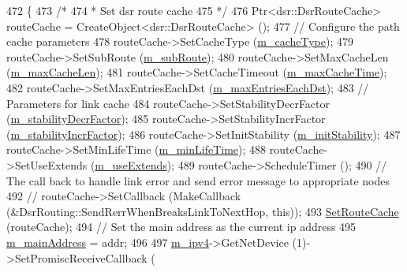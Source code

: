 \begin{DoxyCode}
472             \{
473               \textcolor{comment}{/*}
474 \textcolor{comment}{               * Set dsr route cache}
475 \textcolor{comment}{               */}
476               Ptr<dsr::DsrRouteCache> routeCache = CreateObject<dsr::DsrRouteCache> ();
477               \textcolor{comment}{// Configure the path cache parameters}
478               routeCache->SetCacheType (\hyperlink{classns3_1_1dsr_1_1DsrRouting_a07e25fa5f4aebf7b129a31853988045b}{m\_cacheType});
479               routeCache->SetSubRoute (\hyperlink{classns3_1_1dsr_1_1DsrRouting_a83f7a7d54f8b078d987d46cf6edcd08e}{m\_subRoute});
480               routeCache->SetMaxCacheLen (\hyperlink{classns3_1_1dsr_1_1DsrRouting_afce2c0909aecc7dfe4528f7f6b042019}{m\_maxCacheLen});
481               routeCache->SetCacheTimeout (\hyperlink{classns3_1_1dsr_1_1DsrRouting_a76d8abfedbda7429e983c407748400be}{m\_maxCacheTime});
482               routeCache->SetMaxEntriesEachDst (\hyperlink{classns3_1_1dsr_1_1DsrRouting_a470ec4bd470cd1d802621752331d9916}{m\_maxEntriesEachDst});
483               \textcolor{comment}{// Parameters for link cache}
484               routeCache->SetStabilityDecrFactor (\hyperlink{classns3_1_1dsr_1_1DsrRouting_a4a6db69db44738ae07289fa0993ac916}{m\_stabilityDecrFactor});
485               routeCache->SetStabilityIncrFactor (\hyperlink{classns3_1_1dsr_1_1DsrRouting_a9c6b73944ece2adc5f06b5010d9e55f2}{m\_stabilityIncrFactor});
486               routeCache->SetInitStability (\hyperlink{classns3_1_1dsr_1_1DsrRouting_a9b68bafde23cf10e425d341f91da3b5e}{m\_initStability});
487               routeCache->SetMinLifeTime (\hyperlink{classns3_1_1dsr_1_1DsrRouting_ad7daf5388ab1104e535b27bb4eae1421}{m\_minLifeTime});
488               routeCache->SetUseExtends (\hyperlink{classns3_1_1dsr_1_1DsrRouting_aa0a73bc163b0b32c84a5913ebbb62dc5}{m\_useExtends});
489               routeCache->ScheduleTimer ();
490               \textcolor{comment}{// The call back to handle link error and send error message to appropriate nodes}
492 \textcolor{comment}{}              \textcolor{comment}{// routeCache->SetCallback (MakeCallback (&DsrRouting::SendRerrWhenBreaksLinkToNextHop,
       this));}
493               \hyperlink{classns3_1_1dsr_1_1DsrRouting_af61179a03e52ebee0822caac80a830ff}{SetRouteCache} (routeCache);
494               \textcolor{comment}{// Set the main address as the current ip address}
495               \hyperlink{classns3_1_1dsr_1_1DsrRouting_a73182b5edee2d8460f28855e058fc9a0}{m\_mainAddress} = addr;
496 
497               \hyperlink{classns3_1_1dsr_1_1DsrRouting_aa42c1b9ee27c8168a2141d3d032006c3}{m\_ipv4}->GetNetDevice (1)->SetPromiscReceiveCallback (

\end{DoxyCode}

